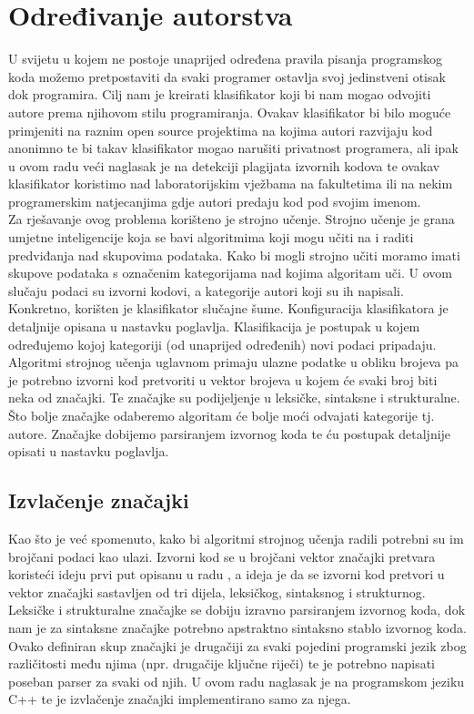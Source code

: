 \chapter{Određivanje autorstva}
U svijetu u kojem ne postoje unaprijed određena pravila pisanja programskog koda možemo pretpostaviti da svaki programer ostavlja svoj jedinstveni otisak dok programira. Cilj nam je kreirati klasifikator koji bi nam mogao odvojiti autore prema njihovom stilu programiranja. Ovakav klasifikator bi bilo moguće primjeniti na raznim open source projektima na kojima autori razvijaju kod anonimno te bi takav klasifikator mogao narušiti privatnost programera, ali ipak u ovom radu veći naglasak je na detekciji plagijata izvornih kodova te ovakav klasifikator koristimo nad laboratorijskim vježbama na fakultetima ili na nekim programerskim natjecanjima gdje autori predaju kod pod svojim imenom. \\

	Za rješavanje ovog problema korišteno je strojno učenje. Strojno učenje je grana umjetne inteligencije koja se bavi algoritmima koji mogu učiti na i raditi predviđanja nad skupovima podataka. Kako bi mogli strojno učiti moramo imati skupove podataka s označenim kategorijama nad kojima algoritam uči. U ovom slučaju podaci su izvorni kodovi, a kategorije autori koji su ih napisali. Konkretno, korišten je klasifikator slučajne šume. Konfiguracija klasifikatora je detaljnije opisana u nastavku poglavlja. Klasifikacija je postupak u kojem određujemo kojoj kategoriji (od unaprijed određenih) novi podaci pripadaju. Algoritmi strojnog učenja uglavnom primaju ulazne podatke u obliku brojeva pa je potrebno izvorni kod pretvoriti u vektor brojeva u kojem će svaki broj biti neka od značajki. Te značajke su podijeljenje u leksičke, sintaksne i strukturalne. Što bolje značajke odaberemo algoritam će bolje moći odvajati kategorije tj. autore. Značajke dobijemo parsiranjem izvornog koda te ću postupak detaljnije opisati u nastavku poglavlja.
\newpage
{}
	
\section{Izvlačenje značajki}
Kao što je već spomenuto, kako bi algoritmi strojnog učenja radili potrebni su im brojčani podaci kao ulazi. Izvorni kod se u brojčani vektor značajki pretvara koristeći ideju prvi put opisanu u radu \cite{islam}, a ideja je da se izvorni kod pretvori u vektor značajki sastavljen od tri dijela, leksičkog, sintaksnog i strukturnog. Leksičke i strukturalne značajke se dobiju izravno parsiranjem izvornog koda, dok nam je za sintaksne značajke potrebno apstraktno sintaksno stablo izvornog koda. Ovako definiran skup značajki je drugačiji za svaki pojedini programski jezik zbog različitosti među njima (npr. drugačije ključne riječi) te je potrebno napisati poseban parser za svaki od njih. U ovom radu naglasak je na programskom jeziku C++ te je izvlačenje značajki implementirano samo za njega. \\

